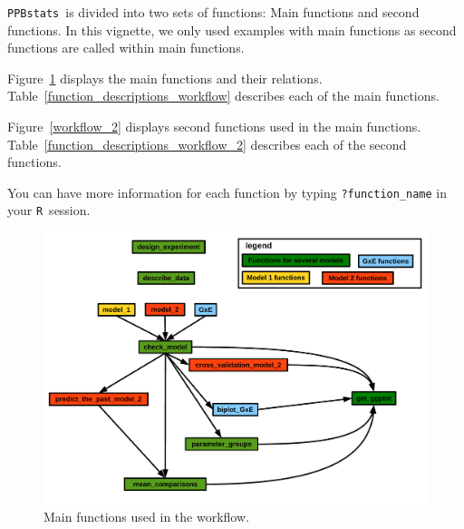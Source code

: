 \documentclass{book}\usepackage[]{graphicx}\usepackage[]{color}
\newcommand{\pack}{\texttt{PPBstats}}
\newcommand{\R}{\texttt{R}}
\begin{document}
\pack~is divided into two sets of functions: Main functions and second functions.
In this vignette, we only used examples with main functions as second functions are called within main functions.

Figure~\ref{main_workflow} displays the main functions and their relations.
Table~\ref{function_descriptions_workflow} describes each of the main functions.

Figure~\ref{workflow_2} displays second functions used in the main functions.
Table~\ref{function_descriptions_workflow_2} describes each of the second functions.

You can have more information for each function by typing \texttt{?function\_name} in your \R~session.


\begin{figure}[H]
\begin{center}
\includegraphics[width=\textwidth,page=1]{PBBstats_function_relations}
\end{center}
\caption{Main functions used in the workflow.}
\label{main_workflow}
\end{figure}
\end{document}
